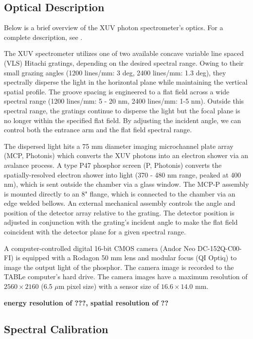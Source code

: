 \subsection{Optical Description}

Below is a brief overview of the XUV photon spectrometer's optics. For a complete description, see \cite{hagemanComplexAttosecondTransientAbsorption2020}.

The XUV spectrometer utilizes one of two available concave variable line spaced (VLS) Hitachi gratings, depending on the desired spectral range. Owing to their small grazing angles (1200 lines/mm: 3 deg, 2400 lines/mm: 1.3 deg), they spectrally disperse the light in the horizontal plane while maintaining the vertical spatial profile. The groove spacing is engineered to a flat field across a wide spectral range (1200 lines/mm: 5 - 20 nm, 2400 lines/mm: 1-5 nm). Outside this spectral range, the gratings continue to disperse the light but the focal plane is no longer within the specified flat field. By adjusting the incident angle, we can control both the entrance arm and the flat field spectral range.

The dispersed light hits a 75 mm diameter imaging microchannel plate array (MCP, Photonis) which converts the XUV photons into an electron shower via an avalance process. A type P47 phosphor screen (P, Photonis) converts the spatially-resolved electron shower into light (370 - 480 nm range, peaked at 400 nm), which is sent outside the chamber via a glass window. The MCP-P assembly is mounted directly to an 8" flange, which is connected to the chamber via an edge welded bellows. An external mechanical assembly controls the angle and position of the detector array relative to the grating. The detector position is adjusted in conjunction with the grating's incident angle to make the flat field coincident with the detector plane for a given spectral range.

A computer-controlled digital 16-bit CMOS camera (Andor Neo DC-152Q-C00-FI) is equipped with a Rodagon 50 mm lens and modular focus (QI Optiq) to image the output light of the phosphor. The camera image is recorded to the TABLe computer's hard drive. The camera images have a maximum resolution of $2560 \times 2160$ (6.5 $\mu$m pixel size) with a sensor size of $16.6 \times 14.0$ mm.

\textbf{energy resolution of ???, spatial resolution of ??}

\subsection{Spectral Calibration}

